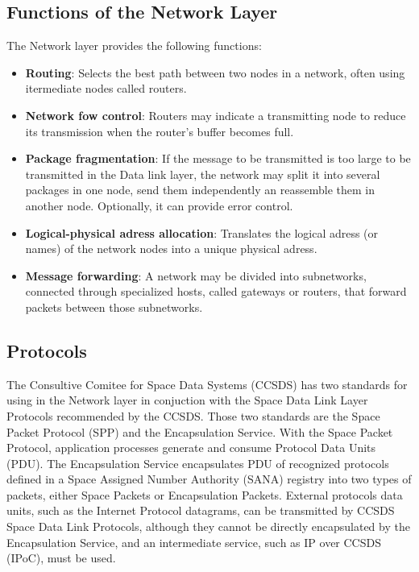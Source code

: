 \subsection{Functions of the Network Layer}
The Network layer provides the following functions:

\begin{itemize}
\item \textbf{Routing}: Selects the best path between two nodes in a network, often using itermediate nodes called routers.
\item \textbf{Network fow control}: Routers may indicate a transmitting node to reduce its transmission when the router's buffer becomes full.
\item \textbf{Package fragmentation}: If the message to be transmitted is too large to be transmitted in the Data link layer, the network may split it into several packages in one node, send them independently an reassemble them in another node. Optionally, it can provide error control.
\item \textbf{Logical-physical adress allocation}: Translates the logical adress (or names) of the network nodes into a unique physical adress.
\item \textbf{Message forwarding}: A network may be divided into subnetworks, connected through specialized hosts, called gateways or routers, that forward packets between those subnetworks.
\end{itemize}

\subsection{Protocols}
The Consultive Comitee for Space Data Systems (CCSDS)\cite{CCSDSOverview} has two standards for using in the Network layer in conjuction with the Space Data Link Layer Protocols recommended by the CCSDS. Those two standards are the Space Packet Protocol (SPP)\cite{SPP} and the Encapsulation Service\cite{ES}. With the Space Packet Protocol, application processes generate and consume Protocol Data Units (PDU). The Encapsulation Service encapsulates PDU of recognized protocols defined in a Space Assigned Number Authority (SANA)\cite{SANA} registry into two types of packets, either Space Packets or Encapsulation Packets. External protocols data units, such as the Internet Protocol datagrams, can be transmitted by CCSDS Space Data Link Protocols, although they cannot be directly encapsulated by the Encapsulation Service, and an intermediate service, such as IP over CCSDS (IPoC)\cite{IPoC}, must be used.

